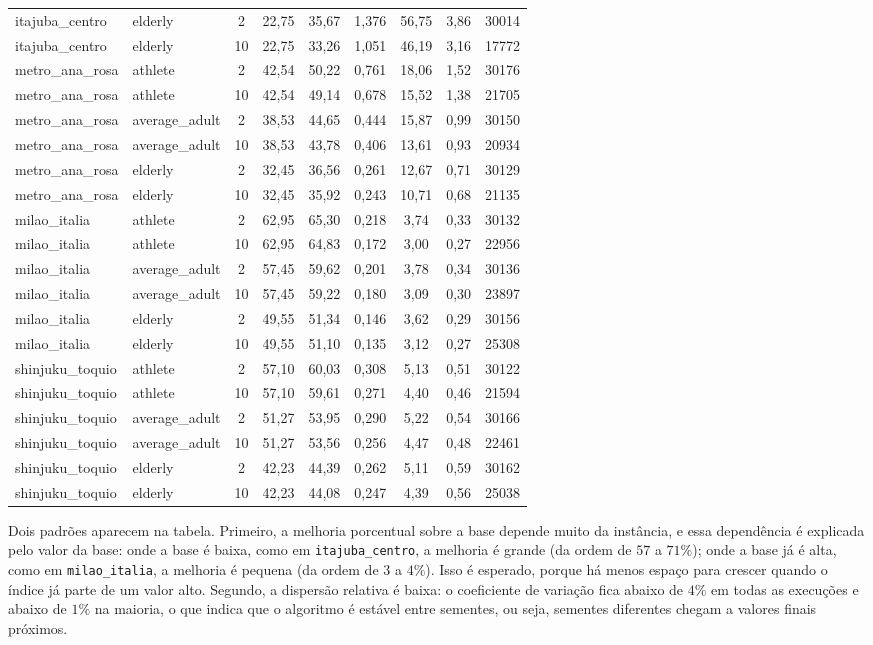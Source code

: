 \documentclass[11pt,a4paper]{article}
\newcommand{\code}[1]{\texttt{#1}}
\begin{document}
\begin{longtable}{@{}l l c c c c c c c@{}}
itajuba\_centro & elderly & 2 & 22,75 & 35,67 & 1,376 & 56,75 & 3,86 & 30014 \\
itajuba\_centro & elderly & 10 & 22,75 & 33,26 & 1,051 & 46,19 & 3,16 & 17772 \\
metro\_ana\_rosa & athlete & 2 & 42,54 & 50,22 & 0,761 & 18,06 & 1,52 & 30176 \\
metro\_ana\_rosa & athlete & 10 & 42,54 & 49,14 & 0,678 & 15,52 & 1,38 & 21705 \\
metro\_ana\_rosa & average\_adult & 2 & 38,53 & 44,65 & 0,444 & 15,87 & 0,99 & 30150 \\
metro\_ana\_rosa & average\_adult & 10 & 38,53 & 43,78 & 0,406 & 13,61 & 0,93 & 20934 \\
metro\_ana\_rosa & elderly & 2 & 32,45 & 36,56 & 0,261 & 12,67 & 0,71 & 30129 \\
metro\_ana\_rosa & elderly & 10 & 32,45 & 35,92 & 0,243 & 10,71 & 0,68 & 21135 \\
milao\_italia & athlete & 2 & 62,95 & 65,30 & 0,218 & 3,74 & 0,33 & 30132 \\
milao\_italia & athlete & 10 & 62,95 & 64,83 & 0,172 & 3,00 & 0,27 & 22956 \\
milao\_italia & average\_adult & 2 & 57,45 & 59,62 & 0,201 & 3,78 & 0,34 & 30136 \\
milao\_italia & average\_adult & 10 & 57,45 & 59,22 & 0,180 & 3,09 & 0,30 & 23897 \\
milao\_italia & elderly & 2 & 49,55 & 51,34 & 0,146 & 3,62 & 0,29 & 30156 \\
milao\_italia & elderly & 10 & 49,55 & 51,10 & 0,135 & 3,12 & 0,27 & 25308 \\
shinjuku\_toquio & athlete & 2 & 57,10 & 60,03 & 0,308 & 5,13 & 0,51 & 30122 \\
shinjuku\_toquio & athlete & 10 & 57,10 & 59,61 & 0,271 & 4,40 & 0,46 & 21594 \\
shinjuku\_toquio & average\_adult & 2 & 51,27 & 53,95 & 0,290 & 5,22 & 0,54 & 30166 \\
shinjuku\_toquio & average\_adult & 10 & 51,27 & 53,56 & 0,256 & 4,47 & 0,48 & 22461 \\
shinjuku\_toquio & elderly & 2 & 42,23 & 44,39 & 0,262 & 5,11 & 0,59 & 30162 \\
shinjuku\_toquio & elderly & 10 & 42,23 & 44,08 & 0,247 & 4,39 & 0,56 & 25038 \\
\bottomrule
\end{longtable}

Dois padrões aparecem na tabela. Primeiro, a melhoria porcentual sobre a base depende muito da instância, e essa dependência é explicada pelo valor da base: onde a base é baixa, como em \code{itajuba\_centro}, a melhoria é grande (da ordem de $57$ a $71\%$); onde a base já é alta, como em \code{milao\_italia}, a melhoria é pequena (da ordem de $3$ a $4\%$). Isso é esperado, porque há menos espaço para crescer quando o índice já parte de um valor alto. Segundo, a dispersão relativa é baixa: o coeficiente de variação fica abaixo de $4\%$ em todas as execuções e abaixo de $1\%$ na maioria, o que indica que o algoritmo é estável entre sementes, ou seja, sementes diferentes chegam a valores finais próximos.
\end{document}
